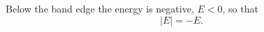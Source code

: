 \documentclass{article}
\begin{document}
Below the band edge the energy is negative, $E<0$, so that
\begin{equation}
|E| = -E .
\label{eq:abs}
\end{equation}
\end{document}
